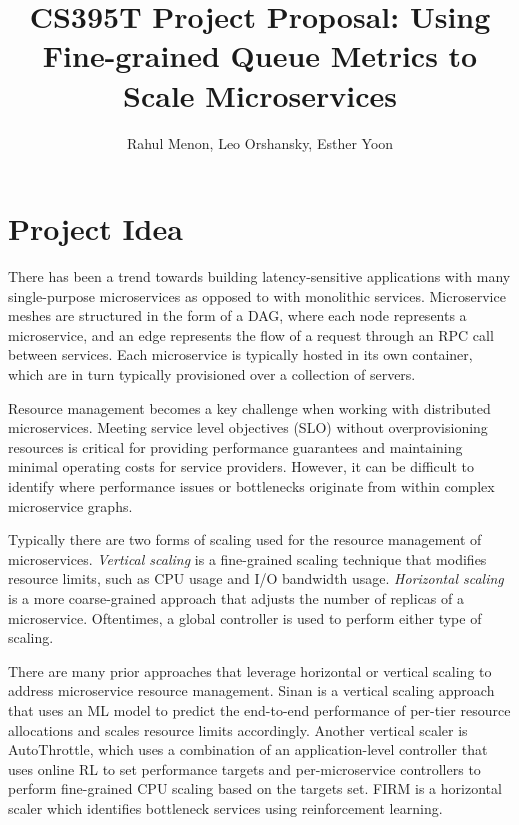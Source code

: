 \documentclass{proposal}
\begin{document}

\title{CS395T Project Proposal: Using Fine-grained Queue Metrics to Scale Microservices
}

\author{Rahul Menon, Leo Orshansky, Esther Yoon}

\maketitle


\section{Project Idea}
There has been a trend towards building latency-sensitive applications with many single-purpose microservices as opposed to with monolithic services. Microservice meshes are structured in the form of a DAG, where each node represents a microservice, and an edge represents the flow of a request through an RPC call between services. Each microservice is typically hosted in its own container, which are in turn typically provisioned over a collection of servers.

Resource management becomes a key challenge when working with distributed microservices. Meeting service level objectives (SLO) without overprovisioning resources is critical for providing performance guarantees and maintaining minimal operating costs for service providers. However, it can be difficult to identify where performance issues or bottlenecks originate from within complex microservice graphs.

Typically there are two forms of scaling used for the resource management of microservices. \textit{Vertical scaling} is a fine-grained scaling technique that modifies resource limits, such as CPU usage and I/O bandwidth usage. \textit{Horizontal scaling} is a more coarse-grained approach that adjusts the number of replicas of a microservice. Oftentimes, a global controller is used to perform either type of scaling.

There are many prior approaches that leverage horizontal or vertical scaling to address microservice resource management. Sinan is a vertical scaling approach that uses an ML model to predict the end-to-end performance of per-tier resource allocations and scales resource limits accordingly. Another vertical scaler is AutoThrottle, which uses a combination of an application-level controller that uses online RL to set performance targets and per-microservice controllers to perform fine-grained CPU scaling based on the targets set. FIRM is a horizontal scaler which identifies bottleneck services using reinforcement learning. 
\end{document}
